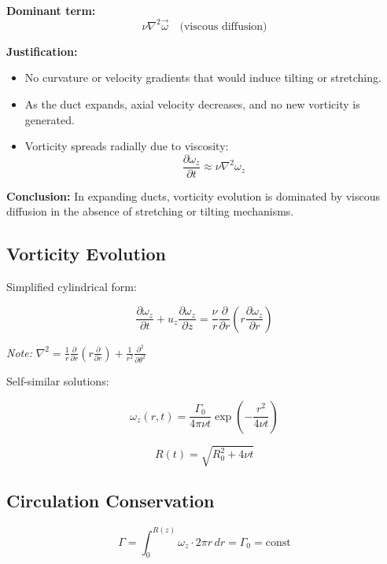 \documentclass{article}
\begin{document}
\textbf{Dominant term:}
\[
\nu \nabla^2 \vec{\omega} \quad \text{(viscous diffusion)}
\]

\textbf{Justification:}
\begin{itemize}
    \item No curvature or velocity gradients that would induce tilting or stretching.
    \item As the duct expands, axial velocity decreases, and no new vorticity is generated.
    \item Vorticity spreads radially due to viscosity:
    \[
    \frac{\partial \omega_z}{\partial t} \approx \nu \nabla^2 \omega_z
    \]
\end{itemize}

\textbf{Conclusion:} In expanding ducts, vorticity evolution is dominated by viscous diffusion in the absence of stretching or tilting mechanisms.

\subsection{Vorticity Evolution}

Simplified cylindrical form:

\begin{equation}
    \frac{\partial \omega_z}{\partial t} + u_z \frac{\partial \omega_z}{\partial z} = \frac{\nu}{r} \frac{\partial}{\partial r} \left( r \frac{\partial \omega_z}{\partial r} \right)
\end{equation}

\textit{Note:} $\nabla^2 = \frac{1}{r} \frac{\partial}{\partial r} \left( r \frac{\partial}{\partial r} \right) + \frac{1}{r^2} \frac{\partial^2}{\partial \theta^2}$

Self-similar solutions:

\begin{equation}
    \omega_z(r,t) = \frac{\Gamma_0}{4\pi \nu t} \exp\left(-\frac{r^2}{4\nu t}\right)
\end{equation}

\begin{equation}
    R(t) = \sqrt{R_0^2 + 4\nu t}
\end{equation}

\subsection{Circulation Conservation}
\begin{equation}
    \Gamma = \int_0^{R(z)} \omega_z \cdot 2\pi r \, dr = \Gamma_0 = \text{const}
\end{equation}
\end{document}
